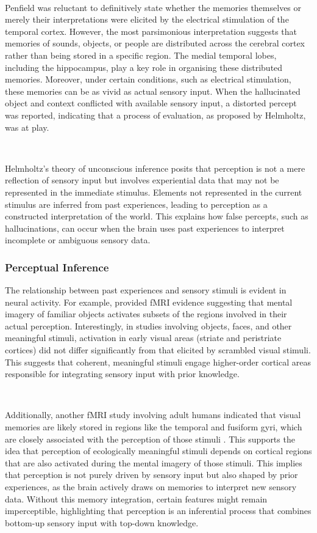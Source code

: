 \documentclass{article}
\begin{document}
\

Penfield was reluctant to definitively state whether the memories themselves or merely their interpretations were elicited by the electrical stimulation of the temporal cortex. However, the most parsimonious interpretation suggests that memories of sounds, objects, or people are distributed across the cerebral cortex rather than being stored in a specific region. The medial temporal lobes, including the hippocampus, play a key role in organising these distributed memories. \citep{aggelopoulos2015perceptual} Moreover, under certain conditions, such as electrical stimulation, these memories can be as vivid as actual sensory input. When the hallucinated object and context conflicted with available sensory input, a distorted percept was reported, indicating that a process of evaluation, as proposed by Helmholtz, was at play.

\

Helmholtz’s theory of unconscious inference posits that perception is not a mere reflection of sensory input but involves experiential data that may not be represented in the immediate stimulus. \citep{helmholtz1867concerning} Elements not represented in the current stimulus are inferred from past experiences, leading to perception as a constructed interpretation of the world. This explains how false percepts, such as hallucinations, can occur when the brain uses past experiences to interpret incomplete or ambiguous sensory data.


\subsubsection{Perceptual Inference}

The relationship between past experiences and sensory stimuli is evident in neural activity. For example, \citet{ishai2000distributed} provided fMRI evidence suggesting that mental imagery of familiar objects activates subsets of the regions involved in their actual perception. Interestingly, in studies involving objects, faces, and other meaningful stimuli, activation in early visual areas (striate and peristriate cortices) did not differ significantly from that elicited by scrambled visual stimuli. This suggests that coherent, meaningful stimuli engage higher-order cortical areas responsible for integrating sensory input with prior knowledge.

\

Additionally, another fMRI study involving adult humans indicated that visual memories are likely stored in regions like the temporal and fusiform gyri, which are closely associated with the perception of those stimuli \citep{sterpenich2007sleep}. This supports the idea that perception of ecologically meaningful stimuli depends on cortical regions that are also activated during the mental imagery of those stimuli. This implies that perception is not purely driven by sensory input but also shaped by prior experiences, as the brain actively draws on memories to interpret new sensory data. Without this memory integration, certain features might remain imperceptible, highlighting that perception is an inferential process that combines bottom-up sensory input with top-down knowledge.
\end{document}
